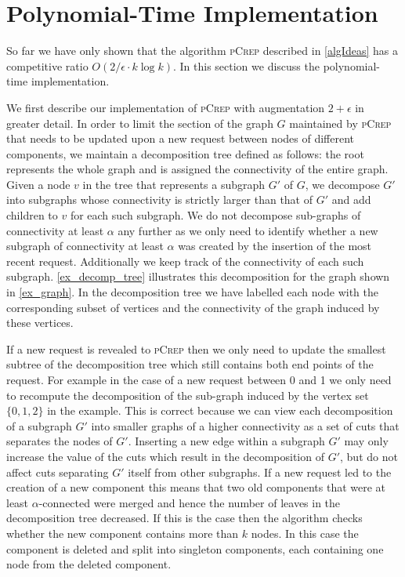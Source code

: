 \documentclass[a4paper,UKenglish,cleveref, autoref, thm-restate,authorcolumns]{lipics-v2019}
\newcommand{\adjDel}{\textsc{pCrep}}
\begin{document}
\section{Polynomial-Time Implementation}
\label{implDetSection}

So far we have only shown that the algorithm \adjDel{} described in \cref{algIdeas} has a competitive ratio $O(2/\epsilon\cdot k \log k)$. In this section we discuss the polynomial-time implementation.

We first describe our implementation of \adjDel{} with augmentation $2+\epsilon$ in greater detail.
In order to limit the section of the graph $G$ maintained by \adjDel{} that needs to be updated upon a new request between nodes of different components, we maintain a decomposition tree defined as follows: the root represents the whole graph and is assigned the connectivity of the entire graph. Given a node $v$ in the tree that represents a subgraph $G'$ of $G$, we decompose $G'$ into subgraphs whose connectivity is strictly larger than that of $G'$ and add children to $v$ for each such subgraph. We do not decompose sub-graphs of connectivity at least $\alpha$ any further as we only need to identify whether a new subgraph of connectivity at least $\alpha$ was created by the insertion of the most recent request.
Additionally we keep track of the connectivity of each such subgraph.
\cref{ex_decomp_tree} illustrates this decomposition for the graph shown in \cref{ex_graph}. In the decomposition tree we have labelled each node with the corresponding subset of vertices and the connectivity of the graph induced by these vertices.

If a new request is revealed to \adjDel{} then we only need to update the smallest subtree of the decomposition tree which still contains both end points of the request. For example in the case of a new request between 0 and 1 we only need to recompute the decomposition of the sub-graph induced by the vertex set $\{0,1,2\}$ in the example. 
This is correct because we can view each decomposition of a subgraph $G'$ into smaller graphs of a higher connectivity as a set of cuts that separates the nodes of $G'$. Inserting a new edge within a subgraph $G'$ may only increase the value of the cuts which result in the decomposition of $G'$, but do not affect cuts separating $G'$ itself from other subgraphs.
If a new request led to the creation of a new component this means that two old components that were at least $\alpha$-connected were merged and hence the number of leaves in the decomposition tree decreased. If this is the case then the algorithm checks whether the new component contains more than $k$ nodes. In this case the component is deleted and split into singleton components, each containing one node from the deleted component.
\end{document}
